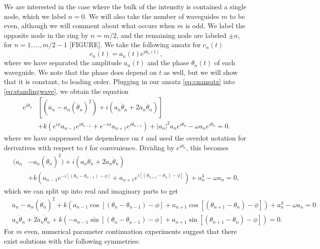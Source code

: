 \documentclass[11pt,reqno]{amsart}
\begin{document}
We are interested in the case where the bulk of the intensity is contained a single node, which we label $n=0$. We will also take the number of waveguides $m$ to be even, although we will comment about what occurs when $m$ is odd. We label the opposite node in the ring by $n=m/2$, and the remaining node are labeled $\pm n$, for $n = 1, \dots, m/2-1$ [FIGURE]. We take the following ansatz for $c_n(t)$
\begin{equation}\label{eq:cnansatz}
c_n(t) = a_n(t)e^{i \theta_n(t)},
\end{equation}
where we have separated the amplitude $a_n(t)$ and the phase $\theta_n(t)$ of each waveguide. We note that the phase does depend on $t$ as well, but we will show that it is constant, to leading order. Plugging in our ansatz \cref{eq:cnansatz} into \cref{eq:standingwave}, we obtain the equation
\begin{align*}
e^{i \theta_n}&\left[ (\ddot a_n - a_n (\dot \theta_n)^2) 
+ i ( a_n \ddot\theta_n + 2 \dot a_n \dot \theta_n ) \right] \\
&+ k\left(e^{i\phi}a_{n-1}e^{i \theta_{n-1}} +e^{-i\phi}a_{n+1}e^{i \theta_{n+1}}\right)+|a_n|^2 a_n e^{i \theta_n} - \omega a_n e^{i \theta_n} = 0.
\end{align*}
where we have suppressed the dependence on $t$ and used the overdot notation for derivatives with respect to $t$ for convenience. Dividing by $e^{i \theta_n}$, this becomes
\begin{equation}\label{eq:st2}
\begin{aligned}
(\ddot a_n &- a_n (\dot \theta_n)^2) 
+ i ( a_n \ddot\theta_n + 2 \dot a_n \dot \theta_n )\\
&+ k\left(a_{n-1}e^{-i[(\theta_n - \theta_{n-1}) - \phi]} + a_{n+1}e^{i[(\theta_{n+1} - \theta_{n}) - \phi]} \right)+a_n^3 - \omega a_n = 0,
\end{aligned}
\end{equation}	
which we can split up into real and imaginary parts to get
\begin{align}
&\ddot a_n - a_n (\dot \theta_n)^2 +
 k\left(a_{n-1}\cos[(\theta_n - \theta_{n-1}) - \phi] + a_{n+1}\cos[(\theta_{n+1} - \theta_{n}) - \phi] \right)+a_n^3 - \omega a_n = 0 \label{eq:st2real} \\
&a_n \ddot\theta_n + 2 \dot a_n \dot \theta_n
+ k\left(-a_{n-1}\sin[(\theta_n - \theta_{n-1}) - \phi] + a_{n+1}\sin [(\theta_{n+1} - \theta_{n}) - \phi] \right) = 0. \label{eq:st2imag}
\end{align}
For $m$ even, numerical parameter continuation experiments suggest that there exist solutions with the following symmetries:
\end{document}
